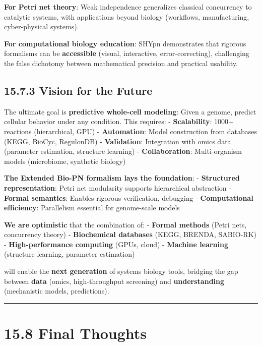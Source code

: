 \textbf{For Petri net theory}: Weak independence generalizes classical
concurrency to catalytic systems, with applications beyond biology
(workflows, manufacturing, cyber-physical systems).

\textbf{For computational biology education}: SHYpn demonstrates that
rigorous formalisms can be \textbf{accessible} (visual, interactive,
error-correcting), challenging the false dichotomy between mathematical
precision and practical usability.

\hypertarget{vision-for-the-future}{%
\subsection{15.7.3 Vision for the Future}\label{vision-for-the-future}}

The ultimate goal is \textbf{predictive whole-cell modeling}: Given a
genome, predict cellular behavior under any condition. This requires: -
\textbf{Scalability}: 1000+ reactions (hierarchical, GPU) -
\textbf{Automation}: Model construction from databases (KEGG, BioCyc,
RegulonDB) - \textbf{Validation}: Integration with omics data (parameter
estimation, structure learning) - \textbf{Collaboration}: Multi-organism
models (microbiome, synthetic biology)

\textbf{The Extended Bio-PN formalism lays the foundation}: -
\textbf{Structured representation}: Petri net modularity supports
hierarchical abstraction - \textbf{Formal semantics}: Enables rigorous
verification, debugging - \textbf{Computational efficiency}: Parallelism
essential for genome-scale models

\textbf{We are optimistic} that the combination of: - \textbf{Formal
methods} (Petri nets, concurrency theory) - \textbf{Biochemical
databases} (KEGG, BRENDA, SABIO-RK) - \textbf{High-performance
computing} (GPUs, cloud) - \textbf{Machine learning} (structure
learning, parameter estimation)

will enable the \textbf{next generation} of systems biology tools,
bridging the gap between \textbf{data} (omics, high-throughput
screening) and \textbf{understanding} (mechanistic models, predictions).

\begin{center}\rule{0.5\linewidth}{0.5pt}\end{center}

\hypertarget{final-thoughts}{%
\section{15.8 Final Thoughts}\label{final-thoughts}}

